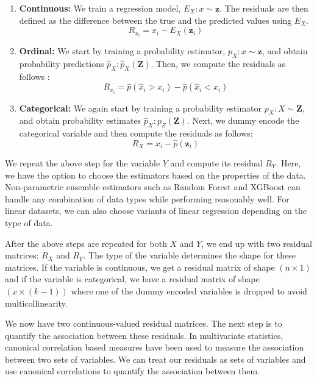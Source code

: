 \documentclass{uai2025} %
\begin{document}
\begin{enumerate}
	\item \textbf{Continuous:} We train a regression model, $ E_X: x \sim
		\bm{z} $. The residuals are then defined as the difference
		between the true and the predicted values using $ E_X $. 
		$$ R_{x_i} = x_i - E_X(\bm{z}_i) $$
	\item \textbf{Ordinal:} We start by training a probability estimator, $
		p_X: x \sim \bm{z} $, and obtain probability predictions 
		$ \hat{p}_X: \hat{p}_X(\bm{Z}) $. Then, we compute the residuals
		as follows \citep{Li2012}:
		$$ R_{x_i} = \hat{p}(\hat{x}_i > x_i) - \hat{p}(\hat{x}_i < x_i) $$
	\item \textbf{Categorical:} We again start by training a probability
		estimator $ p_X: X \sim \bm{Z} $, and obtain probability
		estimates $ \hat{p}_X: p_Z(\bm{Z}) $. Next, we dummy encode the
		categorical variable and then compute the residuals as follows: 
		$$ R_X = x_i - \hat{p}(\bm{z}_i) $$
\end{enumerate}


We repeat the above step for the variable $ Y $ and compute its residual $ R_Y
$. Here, we have the option to choose the estimators based on the properties of
the data. Non-parametric ensemble estimators such as Random Forest and XGBoost
can handle any combination of data types while performing reasonably well. For
linear datasets, we can also choose variants of linear regression depending on
the type of data. 

After the above steps are repeated for both $ X $ and $ Y $, we end up with two
residual matrices: $ R_X $ and $ R_Y $. The type of the variable determines the
shape for these matrices. If the variable is continuous, we get a residual
matrix of shape $ ( n \times 1 ) $ and if the variable is categorical, we have
a residual matrix of shape $ ( x \times (k -1)) $ where one of the dummy encoded
variables is dropped to avoid multicollinearity.

We now have two continuous-valued residual matrices. The next step is
to quantify the association between these residuals. In multivariate
statistics, canonical correlation based measures have been used to measure
the association between two sets of variables. We can treat our residuals
as sets of variables and use canonical correlations to quantify the association
between them.
\end{document}
